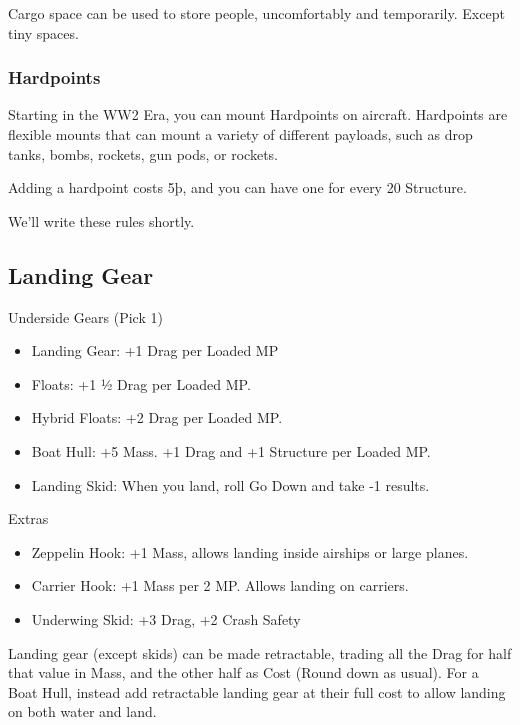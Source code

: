 \documentclass{article}
\begin{document}
Cargo space can be used to store people, uncomfortably and temporarily.
Except tiny spaces.

\subsubsection{Hardpoints}
\label{_Hardpoints}

Starting in the WW2 Era, you can mount Hardpoints on aircraft.
Hardpoints are flexible mounts that can mount a variety of different
payloads, such as drop tanks, bombs, rockets, gun pods, or rockets.

Adding a hardpoint costs 5þ, and you can have one for every 20
Structure.

We'll write these rules shortly.

\subsection{Landing Gear}
\label{_Landing_Gear}

Underside Gears (Pick 1)

\begin{itemize}
    \item          Landing Gear: +1 Drag per Loaded MP
    \item          Floats: +1 ½ Drag per Loaded MP.
    \item          Hybrid Floats: +2 Drag per Loaded MP.
    \item          Boat Hull: +5 Mass. +1 Drag and +1 Structure per Loaded MP.
    \item          Landing Skid: When you land, roll Go Down and take -1 results.
\end{itemize}

Extras

\begin{itemize}
    \item          Zeppelin Hook: +1 Mass, allows landing inside airships or large
          planes.
\end{itemize}

\begin{itemize}
    \item          Carrier Hook: +1 Mass per 2 MP. Allows landing on carriers.
    \item          Underwing Skid: +3 Drag, +2 Crash Safety
\end{itemize}

Landing gear (except skids) can be made retractable, trading all the
Drag for half that value in Mass, and the other half as Cost (Round down
as usual). For a Boat Hull, instead add retractable landing gear at
their full cost to allow landing on both water and land.
\end{document}
